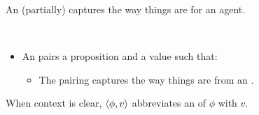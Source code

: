 \begin{note}
  An \evalN{} (partially) captures the way things are for an agent.

  \begin{definition}[\evalN{3}]
    \label{def:evals}
    \mbox{ }
    \vspace{-\baselineskip}
    \begin{itemize}
    \item
      An \emph{\evalN{}} pairs a proposition and a value such that:
      \begin{itemize}
      \item
        The pairing captures the way things are from an \agpe{}.
      \end{itemize}
    \end{itemize}
    \vspace{-\baselineskip}
  \end{definition}

  \begin{notation}
  \item
    When context is clear, \(\langle \phi, v \rangle\) abbreviates an  of \(\phi\) with \(v\).
  \end{notation}
\end{note}

